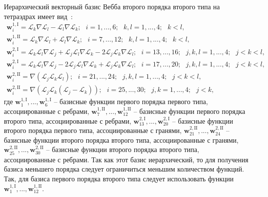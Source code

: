 \documentclass[a4paper,12pt]{article}
\begin{document}
Иерархический векторный базис Вебба второго порядка второго типа на тетраэдрах имеет вид~\citep{mikhajlova}:
\begin{equation}
	\begin{matrix}
		\displaystyle
		\mathbf{w}_{i}^{1,\mathrm{I}} = \mathcal{L}_k \nabla \mathcal{L}_l - \mathcal{L}_l \nabla \mathcal{L}_k ;
		\scriptstyle
		\text{~~} i = 1, ..., 6 ; \text{~~} k, l = 1, ..., 4 ; \text{~~} k < l ,\\
		\displaystyle
		\mathbf{w}_{i}^{1,\mathrm{II}} = \mathcal{L}_k \nabla \mathcal{L}_l + \mathcal{L}_l \nabla \mathcal{L}_k ;
		\scriptstyle
		\text{~~} i = 7, ..., 12 ; \text{~~} k, l = 1, ..., 4 ; \text{~~} k < l ,\\
		\displaystyle
		\mathbf{w}_{i}^{2,\mathrm{I}} = \mathcal{L}_k \mathcal{L}_l \nabla \mathcal{L}_j + \mathcal{L}_j \mathcal{L}_l \nabla \mathcal{L}_k - 2 \mathcal{L}_j \mathcal{L}_k \nabla \mathcal{L}_l ;
		\scriptstyle
		\text{~~} i = 13, ..., 16 ; \text{~~} j, k, l = 1, ..., 4 ; \text{~~} j < k < l ,\\
		\displaystyle
		\mathbf{w}_{i}^{2,\mathrm{I}} = \mathcal{L}_k \mathcal{L}_l \nabla \mathcal{L}_j - 2 \mathcal{L}_j \mathcal{L}_l \nabla \mathcal{L}_k + \mathcal{L}_j \mathcal{L}_k \nabla \mathcal{L}_l ;
		\scriptstyle
		\text{~~} i = 17, ..., 20 ; \text{~~} j, k, l = 1, ..., 4 ; \text{~~} j < k < l ,\\
		\displaystyle
		\mathbf{w}_{i}^{2,\mathrm{II}} = \nabla ( \mathcal{L}_j \mathcal{L}_k \mathcal{L}_l ) ;
		\scriptstyle
		\text{~~} i = 21, ..., 24 ; \text{~~} j, k, l = 1, ..., 4 ; \text{~~} j < k < l ,\\
		\displaystyle
		\mathbf{w}_{i}^{2,\mathrm{II}} = \nabla ( \mathcal{L}_j \mathcal{L}_k ( \mathcal{L}_j - \mathcal{L}_k ) ) ;
		\scriptstyle
		\text{~~} i = 25, ..., 30 ; \text{~~} j, k = 1, ..., 4 ; \text{~~} j < k ,
	\end{matrix}
	\label{eq:basis}
\end{equation}
где $\mathbf{w}_{1}^{1,\mathrm{I}}, ..., \mathbf{w}_{6}^{1,\mathrm{I}}$ -- базисные функции первого порядка первого типа, ассоциированные с ребрами, $\mathbf{w}_{7}^{1,\mathrm{II}}, ..., \mathbf{w}_{12}^{1,\mathrm{II}}$ -- базисные функции первого порядка второго типа, ассоциированные с ребрами, $\mathbf{w}_{13}^{2,\mathrm{I}}, ..., \mathbf{w}_{20}^{2,\mathrm{I}}$ -- базисные функции второго порядка первого типа, ассоциированные с гранями, $\mathbf{w}_{21}^{2,\mathrm{II}}, ..., \mathbf{w}_{24}^{2,\mathrm{II}}$ -- базисные функции второго порядка второго типа, ассоциированные с гранями, $\mathbf{w}_{25}^{2,\mathrm{II}}, ..., \mathbf{w}_{30}^{2,\mathrm{II}}$ -- базисные функции второго порядка второго типа, ассоциированные с ребрами. Так как этот базис иерархический, то для получения базиса меньшего порядка следует ограничиться меньшим количеством функций. Так, для базиса первого порядка второго  типа следует использовать функции $\mathbf{w}_{1}^{1,\mathrm{I}}, ..., \mathbf{w}_{12}^{1,\mathrm{II}}$.
\end{document}
